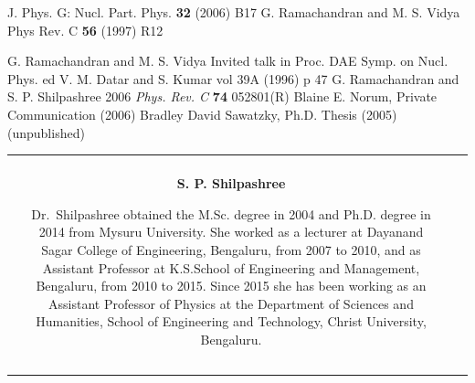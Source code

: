 \begin{thebibliography}{99}
J. Phys. G: Nucl. Part. Phys. {\bf 32} (2006) B17
  G. Ramachandran and M. S. Vidya Phys Rev. C {\bf 56} (1997) R12

G. Ramachandran and M. S. Vidya Invited talk in Proc. DAE Symp. on Nucl. Phys. ed V. M. Datar and S. Kumar vol 39A (1996) p 47
 G. Ramachandran and S. P. Shilpashree 2006 {\it Phys. Rev. C}  {\bf 74} 052801(R)
 Blaine E. Norum, Private Communication (2006)
 Bradley David Sawatzky, Ph.D. Thesis (2005) (unpublished)
\end{thebibliography}

\begin{tabular}{V{2.5}cp{6.2cm}V{2.5}}
 &\\
 & 

\centerline{\large\bf S. P. Shilpashree}

\bigskip
Dr.~Shilpashree obtained the M.Sc. degree in 2004 and Ph.D. degree in 2014 from Mysuru University. She worked as a lecturer at Dayanand Sagar College of Engineering, Bengaluru, from 2007 to 2010, and as Assistant Professor at K.S.School of Engineering and Management, Bengaluru, from 2010 to 2015. Since 2015 she has been working as an Assistant Professor of Physics at the Department of Sciences and Humanities, School of Engineering and Technology, Christ University, Bengaluru.\\
&\\ 
\end{tabular}
